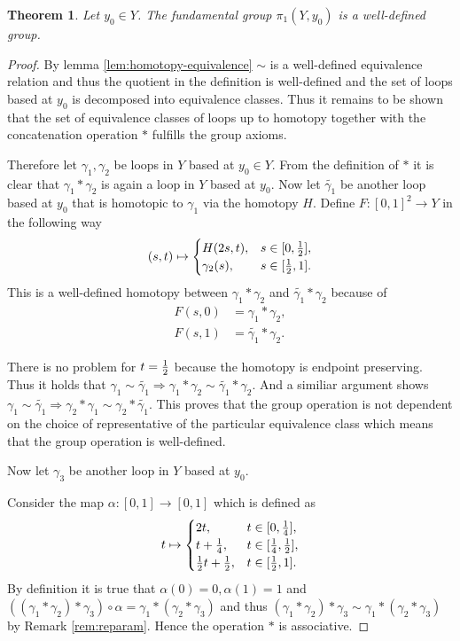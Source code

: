 \documentclass[a4paper, 11pt, twoside]{article}
\theoremstyle{break}
\newtheorem{thm}{Theorem}[section]
\theoremstyle{break}
\begin{document}
\begin{thm}
  Let $y_0 \in Y$. The fundamental group $\pi_1(Y, y_0)$ is a well-defined group. 
\end{thm}

\begin{proof}
  By lemma \ref{lem:homotopy-equivalence} $\sim$ is a well-defined equivalence relation and thus the quotient in the definition is well-defined and the set of loops based at $y_0$ is decomposed into equivalence classes.
  Thus it remains to be shown that the set of equivalence classes of loops up to homotopy together with the concatenation operation $*$ fulfills the group axioms.

  Therefore let $\gamma_1, \gamma_2$ be loops in $Y$ based at $y_0 \in Y$. From the definition of $*$ it is clear that $\gamma_1 * \gamma_2$ is again a loop in $Y$ based at $y_0$.
  Now let $\tilde{\gamma_1}$ be another loop based at $y_0$ that is homotopic to $\gamma_1$ via the homotopy $H$. Define $F\colon [0,1]^2 \to Y$ in the following way
  \begin{equation*}
    (s, t) \mapsto \begin{cases}
      H(2s, t), &s \in [0,{1 \over 2}], \\
      \gamma_2(s), &s \in [{1 \over 2}, 1].
    \end{cases}
  \end{equation*}
  This is a well-defined homotopy between $\gamma_1 * \gamma_2$ and $\tilde{\gamma_1} * \gamma_2$ because of
  \begin{align*}
    F(s, 0) &= \gamma_1 * \gamma_2, \\
    F(s, 1) &= \tilde{\gamma_1} * \gamma_2.
  \end{align*}
  
  There is no problem for $t = {1 \over 2}$ because the homotopy is endpoint preserving. Thus it holds that $\gamma_1 \sim \tilde{\gamma_1} \Rightarrow \gamma_1 * \gamma_2 \sim \tilde{\gamma_1} * \gamma_2$.
  And a similiar argument shows $\gamma_1 \sim \tilde{\gamma_1} \Rightarrow \gamma_2 * \gamma_1 \sim  \gamma_2 * \tilde{\gamma_1}$. 
  This proves that the group operation is not dependent on the choice of representative of the particular equivalence class which means that the group operation is well-defined.

  Now let $\gamma_3$ be another loop in $Y$ based at $y_0$. 

  Consider the map $\alpha\colon [0,1] \to [0,1]$ which is defined as
  \begin{equation*}
    t \mapsto \begin{cases}
      2t, &t \in [0, {1 \over 4}], \\
      t + {1 \over 4}, &t \in [{1\over4}, {1\over2}], \\
      {1\over2}t + {1\over2}, &t\in[{1\over2}, 1].
    \end{cases}
  \end{equation*}
  By definition it is true that $\alpha(0) = 0, \alpha(1) = 1$ and $((\gamma_1 * \gamma_2) * \gamma_3) \circ \alpha = \gamma_1 * (\gamma_2 * \gamma_3)$ and thus $(\gamma_1 * \gamma_2) * \gamma_3 \sim \gamma_1 * (\gamma_2 * \gamma_3)$ by Remark \ref{rem:reparam}.
  Hence the operation $*$ is associative.
  

\end{proof}
\end{document}
